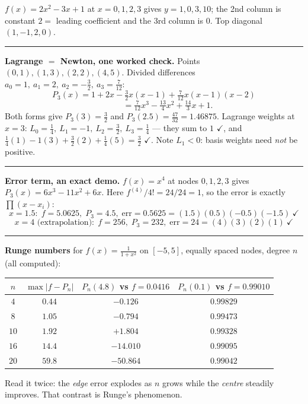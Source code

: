 \begin{numbox}
\medskip
$f(x)=2x^2-3x+1$ at $x=0,1,2,3$ gives $y=1,0,3,10$; the 2nd column is constant $2=$
leading coefficient and the 3rd column is $0$. Top diagonal $(1,-1,2,0)$.

\medskip\hrule\medskip
\textbf{Lagrange $=$ Newton, one worked check.}
Points $(0,1),(1,3),(2,2),(4,5)$. Divided differences
$a_0=1,\ a_1=2,\ a_2=-\tfrac32,\ a_3=\tfrac{7}{12}$:
\[
  P_3(x)=1+2x-\tfrac32 x(x-1)+\tfrac{7}{12}x(x-1)(x-2)
\]
\[
  \phantom{P_3(x)}=\tfrac{7}{12}x^3-\tfrac{13}{4}x^2+\tfrac{14}{3}x+1 .
\]
Both forms give $P_3(3)=\tfrac32$ and $P_3(2.5)=\tfrac{47}{32}=1.46875$.
Lagrange weights at $x=3$: $L_0=\tfrac14,\ L_1=-1,\ L_2=\tfrac32,\ L_3=\tfrac14$ ---
they sum to $1$ $\checkmark$, and
$\tfrac14(1)-1(3)+\tfrac32(2)+\tfrac14(5)=\tfrac32$ $\checkmark$.
Note $L_1<0$: basis weights need \emph{not} be positive.

\medskip\hrule\medskip
\textbf{Error term, an exact demo.} $f(x)=x^4$ at nodes $0,1,2,3$ gives
$P_3(x)=6x^3-11x^2+6x$. Here $f^{(4)}/4!=24/24=1$, so the error is exactly
$\prod(x-x_i)$:
\[
  x=1.5:\; f=5.0625,\; P_3=4.5,\; \text{err}=0.5625=(1.5)(0.5)(-0.5)(-1.5)\ \checkmark
\]
\[
  x=4 \text{ (extrapolation)}:\; f=256,\; P_3=232,\; \text{err}=24=(4)(3)(2)(1)\ \checkmark
\]

\medskip\hrule\medskip
\textbf{Runge numbers} for $f(x)=\frac{1}{1+x^2}$ on $[-5,5]$, equally spaced nodes,
degree $n$ (all computed):
\begin{center}\small
\begin{tabular}{@{}cccc@{}}
\toprule
$n$ & $\max|f-P_n|$ & $P_n(4.8)$ vs $f=0.0416$ & $P_n(0.1)$ vs $f=0.99010$ \\
\midrule
$4$  & $0.44$ & $-0.126$   & $0.99829$ \\
$8$  & $1.05$ & $-0.794$   & $0.99473$ \\
$10$ & $1.92$ & $+1.804$   & $0.99328$ \\
$16$ & $14.4$ & $-14.010$  & $0.99095$ \\
$20$ & $59.8$ & $-50.864$  & $0.99042$ \\
\bottomrule
\end{tabular}
\end{center}
Read it twice: the \emph{edge} error explodes as $n$ grows while the \emph{centre}
steadily improves. That contrast is Runge's phenomenon.
\end{numbox}

